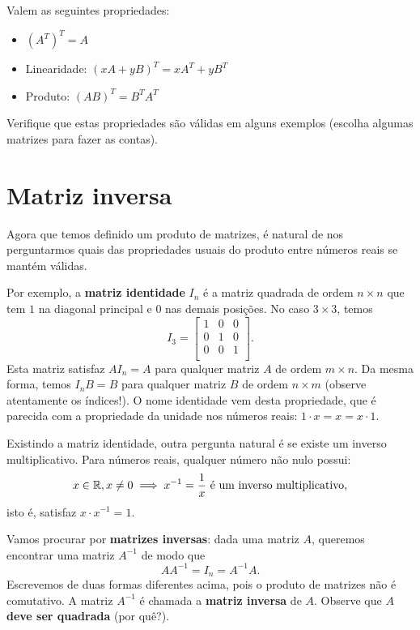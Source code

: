 \documentclass[../livro.tex]{subfiles}  %
\begin{document}
Valem as seguintes propriedades:
\begin{itemize}
	\item $(A^T)^T = A$
	\item Linearidade: $(xA + y B)^T = x A^T + y B^T$
	\item Produto: $(AB)^T = B^T A^T$
\end{itemize}

\begin{exercise}
	Verifique que estas propriedades são válidas em alguns exemplos (escolha algumas matrizes para fazer as contas).
\end{exercise}



\section{Matriz inversa}

Agora que temos definido um produto de matrizes, é natural de nos perguntarmos quais das propriedades usuais do produto entre números reais se mantém válidas.

Por exemplo, a \textbf{matriz identidade} $I_n$ é a matriz quadrada de ordem $n \times n$ que tem $1$ na diagonal principal e $0$ nas demais posições. No caso $3 \times 3$, temos
\[
I_3 =
\left[
\begin{array}{ccc}
1 & 0 & 0 \\
0 & 1 & 0 \\
0 & 0 & 1 \\
\end{array}
\right].
\] Esta matriz satisfaz $A I_n = A$ para qualquer matriz $A$ de ordem $m \times n$. Da mesma forma, temos $I_n B = B$ para qualquer matriz $B$ de ordem $n \times m$ (observe atentamente os índices!). O nome identidade vem desta propriedade, que é parecida com a propriedade da unidade nos números reais: $1\cdot x = x = x\cdot 1$.

Existindo a matriz identidade, outra pergunta natural é se existe um inverso multiplicativo. Para números reais, qualquer número não nulo possui:
\[
x \in \mathbb{R}, x \neq 0 \implies x^{-1} = \frac{1}{x} \ \text{é um inverso multiplicativo,}
\] isto é, satisfaz $x\cdot x^{-1} = 1$.

Vamos procurar por \textbf{matrizes inversas}: dada uma matriz $A$, queremos encontrar uma matriz $A^{-1}$ de modo que
\[
A A^{-1} = I_n = A^{-1} A.
\] Escrevemos de duas formas diferentes acima, pois o produto de matrizes não é comutativo. A matriz $A^{-1}$ é chamada a \textbf{matriz inversa} de $A$. Observe que  \textbf{$A$ deve ser quadrada} (por quê?).
\end{document}
